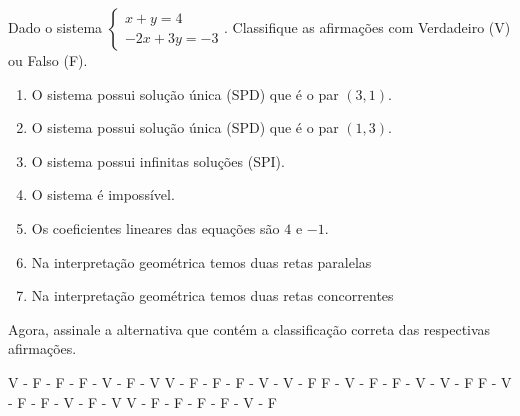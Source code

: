 Dado o sistema $\left\{ \begin{array}{l}
x+y=4\\
-2x+3y=-3
\end{array} \right.$. Classifique as afirmações com Verdadeiro (V) ou Falso (F).
\begin{enumerate}[(\quad)]
\item O sistema possui solução única (SPD) que é o par $(3,1)$.
\item O sistema possui solução única (SPD) que é o par $(1,3)$.
\item O sistema possui infinitas soluções (SPI).
\item O sistema é impossível.
\item Os coeficientes lineares das equações são $4$ e $-1$.
\item Na interpretação geométrica temos duas retas paralelas
\item Na interpretação geométrica temos duas retas concorrentes
\end{enumerate}
Agora, assinale a alternativa que contém a classificação correta das respectivas afirmações.

V - F - F - F - V - F - V
V - F - F - F - V - V - F
F - V - F - F - V - V - F
F - V - F - F - V - F - V
V - F - F - F - F - V - F



